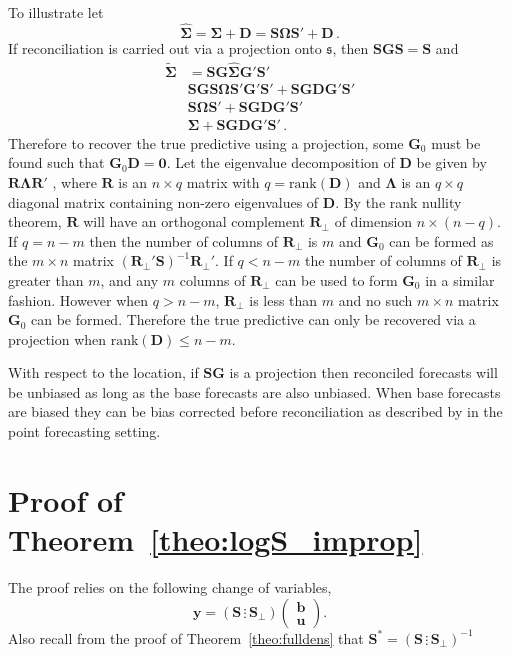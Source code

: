 \documentclass[12pt]{article}
\theoremstyle{definition}
\begin{document}
To illustrate let
\[
\hat{\bm{\Sigma}}=\bm{\Sigma}+{\bm D}=\bm{S}\bm{\Omega}{\bm{S}}'+{\bm D}\,.
\]
If reconciliation is carried out via a projection onto $\mathfrak{s}$, then $\bm{S}\bm{G}\bm{S}=\bm{S}$ and
\begin{align}
\tilde{\bm{\Sigma}}&=\bm{S}\bm{G}\hat{\bm{\Sigma}}\bm{G}'\bm{S}'\nonumber\\
&\bm{S}\bm{G}\bm{S}\bm{\Omega}\bm{S}'\bm{G}'{\bm{S}}'+\bm{S}\bm{G}{\bm D}\bm{G}'\bm{S}'\nonumber\\
&\bm{S}\bm{\Omega}{\bm{S}}'+\bm{S}\bm{G}{\bm D}\bm{G}'\bm{S}'\nonumber\\
&\bm{\Sigma}+\bm{S}\bm{G}{\bm D}\bm{G}'\bm{S}'\nonumber\,.
\end{align}
Therefore to recover the true predictive using a projection, some ${\bm G}_0$ must be found such that ${\bm G}_0{\bm D}=\bm{0}$. Let the eigenvalue decomposition of $\bm {D}$ be given by  ${\bm R}{\bm \Lambda}{\bm R}'$ , where ${\bm R}$ is an $n\times q$ matrix with $q=\textrm{rank}({\bm{D}})$ and ${\bm\Lambda}$ is an $q\times q$ diagonal matrix containing non-zero eigenvalues of ${\bm D}$.  By the rank nullity theorem, $\bm{R}$ will have an orthogonal complement $\bm{R}_{\perp}$ of dimension $n\times (n-q)$.  If $q=n-m$ then the number of columns of $\bm{R}_{\perp}$ is $m$ and ${\bm G}_0$ can be formed as the $m\times n$ matrix $(\bm{R}_{\perp}'\bm{S})^{-1}\bm{R}_{\perp}'$.  If $q<n-m$ the number of columns of $\bm{R}_{\perp}$ is greater than $m$, and any $m$ columns of $\bm{R}_{\perp}$ can be used to form ${\bm G}_0$ in a similar fashion.  However when $q>n-m$, $\bm{R}_{\perp}$ is less than $m$ and no such $m\times n$ matrix ${\bm G}_0$ can be formed.  Therefore the true predictive can only be recovered via a projection when $\textrm{rank}({\bm D})\leq n-m$.

With respect to the location, if $\bm{SG}$ is a projection then reconciled forecasts will be unbiased as long as the base forecasts are also unbiased.  When base forecasts are biased they can be bias corrected before reconciliation as described by \cite{PanEtAl2019HF} in the point forecasting setting.

\clearpage
\section{Proof of Theorem~\ref{theo:logS_improp}}\label{app:logS_improp}

The proof relies on the following change of variables,
\[
\bm{y}=\left(\bm{S}\,\vdots\,\bm{S_\perp}\right)\begin{pmatrix}\bm{b}\\\bm{u}\end{pmatrix}.
\]
Also recall from the proof of Theorem~\ref{theo:fulldens} that $\bm{S}^*=\left(\bm{S}\,\vdots\,\bm{S_\perp}\right)^{-1}$
\end{document}
